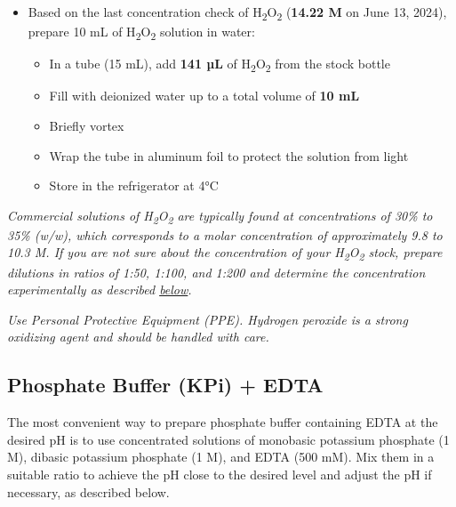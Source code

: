 \documentclass[
  9pt,
  american,
  a5paper,
  extrafontsizes,onecolumn,openright
  ]{memoir}
\providecommand{\tightlist}{%
  \setlength{\itemsep}{0pt}\setlength{\parskip}{0pt}}
\begin{document}
\begin{itemize}
\tightlist
\item
  Based on the last concentration check of H\textsubscript{2}O\textsubscript{2} (\textbf{14.22 M} on June 13, 2024), prepare 10 mL of H\textsubscript{2}O\textsubscript{2} solution in water:

  \begin{itemize}
  \tightlist
  \item
    In a tube (15 mL), add \textbf{141 µL} of H\textsubscript{2}O\textsubscript{2} from the stock bottle
  \item
    Fill with deionized water up to a total volume of \textbf{10 mL}
  \item
    Briefly vortex
  \item
    Wrap the tube in aluminum foil to protect the solution from light
  \item
    Store in the refrigerator at 4°C
  \end{itemize}
\end{itemize}

\begin{greybox}[frametitle = Notes]
\emph{Commercial solutions of H\textsubscript{2}O\textsubscript{2} are typically found at concentrations of 30\% to 35\% (w/w), which corresponds to a molar concentration of approximately 9.8 to 10.3 M. If you are not sure about the concentration of your H\textsubscript{2}O\textsubscript{2} stock, prepare dilutions in ratios of 1:50, 1:100, and 1:200 and determine the concentration experimentally as described \hyperref[checking_h2o2]{below}.}

\end{greybox}

\begin{greybox}[frametitle = CAUTION]
\emph{Use Personal Protective Equipment (PPE). Hydrogen peroxide is a strong oxidizing agent and should be handled with care.}

\end{greybox}

\subsection{Phosphate Buffer (KPi) + EDTA}\label{phosphate-buffer-kpi-edta}

The most convenient way to prepare phosphate buffer containing EDTA at the desired pH is to use concentrated solutions of monobasic potassium phosphate (1 M), dibasic potassium phosphate (1 M), and EDTA (500 mM). Mix them in a suitable ratio to achieve the pH close to the desired level and adjust the pH if necessary, as described below.
\end{document}
